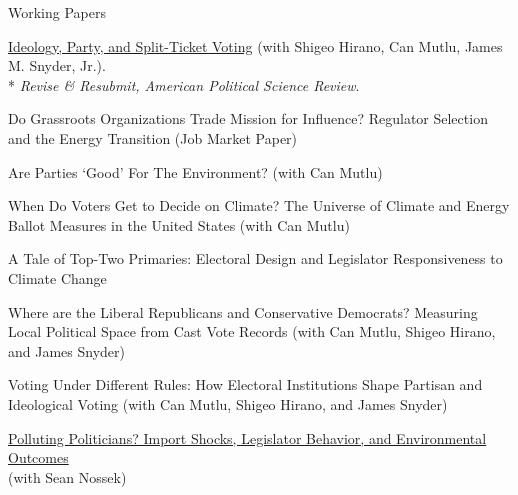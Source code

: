 \documentclass{resume}
\begin{document}
\newpage
\bigskip


\begin{rSection}{\Large W\MakeLowercase{orking} P\MakeLowercase{apers}} \itemsep -3pt {}
\vspace{-0.7cm}

\item \href{https://www.dropbox.com/scl/fi/e3g0hd3l2imdxrfii6dia/partisanship_ideology_and_voting.pdf?rlkey=r3jy4h8a8m48js2kgkare54jf&st=meogwrn2&dl=0}{Ideology, Party, and Split-Ticket Voting} (with Shigeo Hirano, Can Mutlu, James M. Snyder, Jr.).\\*
\textit{Revise \& Resubmit, American Political Science Review}.

\medskip 

\item Do Grassroots Organizations Trade Mission for Influence? Regulator Selection and the Energy Transition (Job Market Paper)

\medskip 

\item Are Parties `Good' For The Environment?  (with Can Mutlu)

\medskip

\item When Do Voters Get to Decide on Climate? The Universe of Climate and Energy Ballot Measures in the United States (with Can Mutlu)

\medskip

\item  A Tale of Top-Two Primaries: Electoral Design and Legislator Responsiveness to Climate Change

\medskip

\item Where are the Liberal Republicans and Conservative Democrats? Measuring Local Political Space from Cast Vote Records (with Can Mutlu, Shigeo Hirano, and James Snyder)

\medskip

\item Voting Under Different Rules: How Electoral Institutions Shape Partisan and Ideological Voting
(with Can Mutlu, Shigeo Hirano, and James Snyder)

\medskip

\item \href{https://www.dropbox.com/scl/fi/l3z5fbgtkh664gs6j9c6s/envr_chinshock_prelim.pdf?rlkey=zng8zmgq7vntjokhsfgaf5x45&dl=0}{Polluting Politicians? Import Shocks, Legislator Behavior, and Environmental Outcomes} \\
(with Sean Nossek)


\end{rSection}
\end{document}
